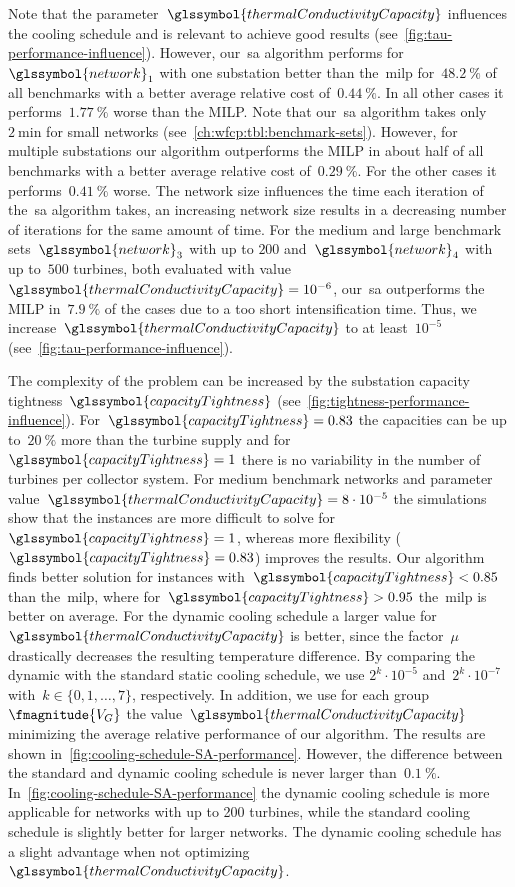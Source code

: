 Note that the parameter~$\glssymbol{thermalConductivityCapacity}$ influences the
cooling schedule and is relevant to achieve good results
(see~\cref{fig:tau-performance-influence}). However, our~\gls{sa} algorithm
performs for~$\glssymbol{network}_1$ with one substation better than
the~\gls{milp} for~$48.2~\%$ of all benchmarks with a better average relative
cost of~$0.44~\%$. In all other cases it performs~$1.77~\%$ worse than the MILP.
Note that our~\gls{sa} algorithm takes only~$\SI{2}{\minute}$ for small networks
(see~\cref{ch:wfcp:tbl:benchmark-sets}). However, for multiple substations our
algorithm outperforms the MILP in about half of all benchmarks with a better
average relative cost of~$0.29~\%$. For the other cases it performs~$0.41~\%$
worse. The network size influences the time each iteration of the~\gls{sa}
algorithm takes,
\ie an increasing network size results in a decreasing number of iterations for
the same amount of time. For the medium and large benchmark
sets~$\glssymbol{network}_3$ with up to $200$ and~$\glssymbol{network}_4$ with
up to~$500$ turbines, both evaluated with
value~$\glssymbol{thermalConductivityCapacity} = 10^{-6}$, our~\gls{sa}
outperforms the MILP in~$7.9~\%$ of the cases due to a too short intensification
time. Thus, we increase~$\glssymbol{thermalConductivityCapacity}$ to at
least~$10^{-5}$ (see~\cref{fig:tau-performance-influence}).

The complexity of the problem can be increased by the substation capacity
tightness~$\glssymbol{capacityTightness}$
(see~\cref{fig:tightness-performance-influence}).
For~$\glssymbol{capacityTightness}=0.83$ the capacities can be up to~$20~\%$
more than the turbine supply and for~$\glssymbol{capacityTightness}=1$ there is
no variability in the number of turbines per collector system. For medium
benchmark networks and parameter
value~$\glssymbol{thermalConductivityCapacity}=8\cdot10^{-5}$ the simulations
show that the instances are more difficult to solve
for~$\glssymbol{capacityTightness}=1$, whereas more flexibility
($\glssymbol{capacityTightness}=0.83$) improves the results. Our algorithm finds
better solution for instances with~$\glssymbol{capacityTightness}<0.85$ than
the~\gls{milp}, where for~$\glssymbol{capacityTightness}>0.95$ the~\gls{milp} is
better on average.
% 
For the dynamic cooling schedule a larger value
for~$\glssymbol{thermalConductivityCapacity}$ is better, since the factor~$\mu$
drastically decreases the resulting temperature difference. By comparing the
dynamic with the standard static cooling schedule, we use
\mbox{$2^k\cdot 10^{-5}$} and~$2^k \cdot 10 ^{-7}$ with~\mbox{$k \in
\{0, 1,\dots, 7\}$}, respectively. In addition, we use for each
group~$\fmagnitude{\turbines}$ the
value~$\glssymbol{thermalConductivityCapacity}$ minimizing the average relative
performance of our algorithm. The results are shown
in~\cref{fig:cooling-schedule-SA-performance}. However, the difference between
the standard and dynamic cooling schedule is never larger than~$0.1~\%$.
In~\cref{fig:cooling-schedule-SA-performance} the dynamic cooling schedule is
more applicable for networks with up to 200 turbines, while the standard cooling
schedule is slightly better for larger networks. The dynamic cooling schedule
has a slight advantage when not
optimizing~$\glssymbol{thermalConductivityCapacity}$.

